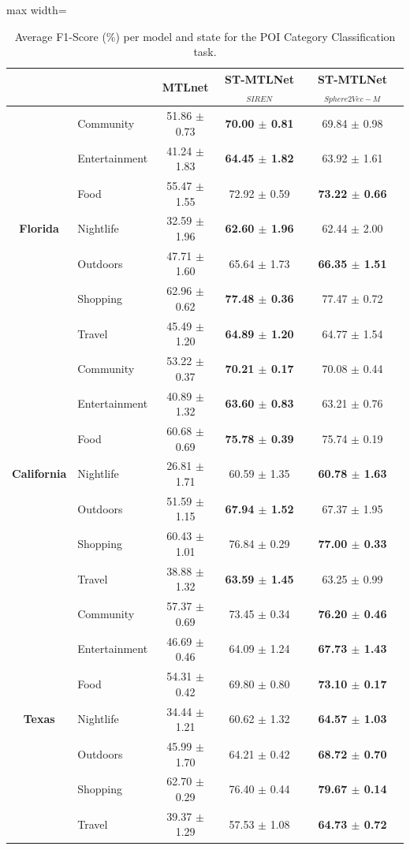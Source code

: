\begin{table}[htbp]
\centering
\caption{Average F1-Score (\%) per model and state for the POI Category Classification task.}
\label{tab:courb:category}
\begin{adjustbox}{max width=\textwidth}
\begin{tabular}{clccc}
\toprule
 & & \textbf{MTLnet} & \textbf{ST-MTLNet$_{SIREN}$} & \textbf{ST-MTLNet$_{Sphere2Vec-M}$} \\
\midrule
\multirow{7}{*}{\textbf{Florida}} & Community & 51.86 $\pm$ 0.73 & \textbf{70.00 $\pm$ 0.81} & 69.84 $\pm$ 0.98 \\
 & Entertainment & 41.24 $\pm$ 1.83 & \textbf{64.45 $\pm$ 1.82} & 63.92 $\pm$ 1.61 \\
 & Food & 55.47 $\pm$ 1.55 & 72.92 $\pm$ 0.59 & \textbf{73.22 $\pm$ 0.66} \\
 & Nightlife & 32.59 $\pm$ 1.96 & \textbf{62.60 $\pm$ 1.96} & 62.44 $\pm$ 2.00 \\
 & Outdoors & 47.71 $\pm$ 1.60 & 65.64 $\pm$ 1.73 & \textbf{66.35 $\pm$ 1.51} \\
 & Shopping & 62.96 $\pm$ 0.62 & \textbf{77.48 $\pm$ 0.36} & 77.47 $\pm$ 0.72 \\
 & Travel & 45.49 $\pm$ 1.20 & \textbf{64.89 $\pm$ 1.20} & 64.77 $\pm$ 1.54 \\
\midrule
\multirow{7}{*}{\textbf{California}} & Community & 53.22 $\pm$ 0.37 & \textbf{70.21 $\pm$ 0.17} & 70.08 $\pm$ 0.44 \\
 & Entertainment & 40.89 $\pm$ 1.32 & \textbf{63.60 $\pm$ 0.83} & 63.21 $\pm$ 0.76 \\
 & Food & 60.68 $\pm$ 0.69 & \textbf{75.78 $\pm$ 0.39} & 75.74 $\pm$ 0.19 \\
 & Nightlife & 26.81 $\pm$ 1.71 & 60.59 $\pm$ 1.35 & \textbf{60.78 $\pm$ 1.63} \\
 & Outdoors & 51.59 $\pm$ 1.15 & \textbf{67.94 $\pm$ 1.52} & 67.37 $\pm$ 1.95 \\
 & Shopping & 60.43 $\pm$ 1.01 & 76.84 $\pm$ 0.29 & \textbf{77.00 $\pm$ 0.33} \\
 & Travel & 38.88 $\pm$ 1.32 & \textbf{63.59 $\pm$ 1.45} & 63.25 $\pm$ 0.99 \\
\midrule
\multirow{7}{*}{\textbf{Texas}} & Community & 57.37 $\pm$ 0.69 & 73.45 $\pm$ 0.34 & \textbf{76.20 $\pm$ 0.46} \\
 & Entertainment & 46.69 $\pm$ 0.46 & 64.09 $\pm$ 1.24 & \textbf{67.73 $\pm$ 1.43} \\
 & Food & 54.31 $\pm$ 0.42 & 69.80 $\pm$ 0.80 & \textbf{73.10 $\pm$ 0.17} \\
 & Nightlife & 34.44 $\pm$ 1.21 & 60.62 $\pm$ 1.32 & \textbf{64.57 $\pm$ 1.03} \\
 & Outdoors & 45.99 $\pm$ 1.70 & 64.21 $\pm$ 0.42 & \textbf{68.72 $\pm$ 0.70} \\
 & Shopping & 62.70 $\pm$ 0.29 & 76.40 $\pm$ 0.44 & \textbf{79.67 $\pm$ 0.14} \\
 & Travel & 39.37 $\pm$ 1.29 & 57.53 $\pm$ 1.08 & \textbf{64.73 $\pm$ 0.72} \\
\bottomrule
\end{tabular}
\end{adjustbox}
\end{table}
